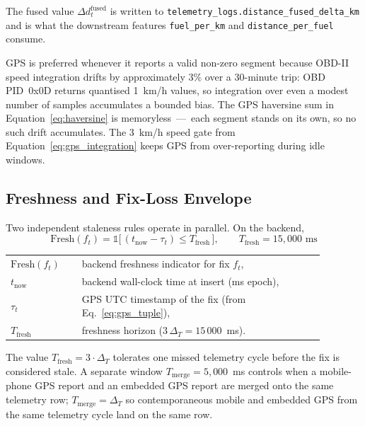 \vspace{0.5em}
The fused value $\Delta d^{\mathrm{fused}}_t$ is written to \texttt{telemetry\_logs.distance\_fused\_delta\_km} and is what the downstream features \texttt{fuel\_per\_km} and \texttt{distance\_per\_fuel} consume.

GPS is preferred whenever it reports a valid non-zero segment because OBD-II speed integration drifts by approximately 3\% over a 30-minute trip: OBD PID~0x0D returns quantised 1~km/h values, so integration over even a modest number of samples accumulates a bounded bias. The GPS haversine sum in Equation~\ref{eq:haversine} is memoryless~---~each segment stands on its own, so no such drift accumulates. The 3~km/h speed gate from Equation~\ref{eq:gps_integration} keeps GPS from over-reporting during idle windows.

\subsection{Freshness and Fix-Loss Envelope}
\label{sec:gps_freshness}

Two independent staleness rules operate in parallel. On the backend,
\begin{equation}
\mathrm{Fresh}(f_t) = \mathbb{1}\bigl[\,(t_{\mathrm{now}} - \tau_t) \leq T_{\mathrm{fresh}}\,\bigr], \qquad T_{\mathrm{fresh}} = 15{,}000\text{ ms}
\label{eq:gps_fresh}
\end{equation}
\noindent\begin{tabular}{@{}p{0.20\linewidth}@{\quad}p{0.68\linewidth}@{}}
$\mathrm{Fresh}(f_t)$ & backend freshness indicator for fix $f_t$, \\
$t_{\mathrm{now}}$ & backend wall-clock time at insert (ms epoch), \\
$\tau_t$ & GPS UTC timestamp of the fix (from Eq.~\ref{eq:gps_tuple}), \\
$T_{\mathrm{fresh}}$ & freshness horizon ($3\,\Delta_T = 15\,000$~ms).
\end{tabular}

\vspace{0.5em}
The value $T_{\mathrm{fresh}} = 3 \cdot \Delta_T$ tolerates one missed telemetry cycle before the fix is considered stale. A separate window $T_{\mathrm{merge}} = 5{,}000$~ms controls when a mobile-phone GPS report and an embedded GPS report are merged onto the same telemetry row; $T_{\mathrm{merge}} = \Delta_T$ so contemporaneous mobile and embedded GPS from the same telemetry cycle land on the same row.

